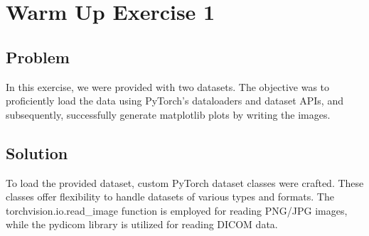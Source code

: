 \section{Warm Up Exercise 1}
\label{sec:warmup1}
    \subsection{Problem}
        In this exercise, we were provided with two datasets. The objective was to proficiently load the data using PyTorch's dataloaders and dataset APIs, and subsequently, successfully generate matplotlib plots by writing the images.
    \subsection{Solution}
        
    To load the provided dataset, custom PyTorch dataset classes were crafted. These classes offer flexibility to handle datasets of various types and formats. The torchvision.io.read\_image function is employed for reading PNG/JPG images, while the pydicom library is utilized for reading DICOM data.
    
